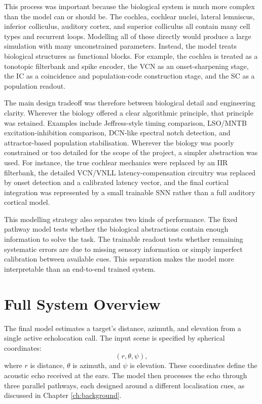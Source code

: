 This process was important because the biological system is much more complex than the model can or should be. The cochlea, cochlear nuclei, lateral lemniscus, inferior colliculus, auditory cortex, and superior colliculus all contain many cell types and recurrent loops. Modelling all of these directly would produce a large simulation with many unconstrained parameters. Instead, the model treats biological structures as functional blocks. For example, the cochlea is treated as a tonotopic filterbank and spike encoder, the VCN as an onset-sharpening stage, the IC as a coincidence and population-code construction stage, and the SC as a population readout.

The main design tradeoff was therefore between biological detail and engineering clarity. Wherever the biology offered a clear algorithmic principle, that principle was retained. Examples include Jeffress-style timing comparison, LSO/MNTB excitation-inhibition comparison, DCN-like spectral notch detection, and attractor-based population stabilisation. Wherever the biology was poorly constrained or too detailed for the scope of the project, a simpler abstraction was used. For instance, the true cochlear mechanics were replaced by an IIR filterbank, the detailed VCN/VNLL latency-compensation circuitry was replaced by onset detection and a calibrated latency vector, and the final cortical integration was represented by a small trainable SNN rather than a full auditory cortical model.

This modelling strategy also separates two kinds of performance. The fixed pathway model tests whether the biological abstractions contain enough information to solve the task. The trainable readout tests whether remaining systematic errors are due to missing sensory information or simply imperfect calibration between available cues. This separation makes the model more interpretable than an end-to-end trained system.

\section{Full System Overview}

The final model estimates a target's distance, azimuth, and elevation from a single active echolocation call. The input scene is specified by spherical coordinates:
\begin{equation}
    (r, \theta, \psi),
\end{equation}
where $r$ is distance, $\theta$ is azimuth, and $\psi$ is elevation. These coordinates define the acoustic echo received at the ears. The model then processes the echo through three parallel pathways, each designed around a different localisation cues, as discussed in Chapter \ref{ch:background}.

